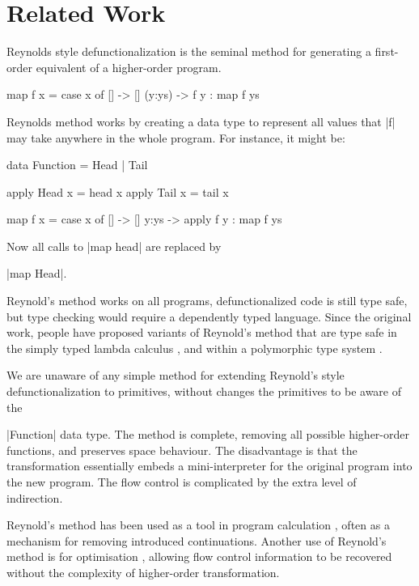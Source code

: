 \documentclass[preprint]{sigplanconf}
\begin{document}
\section{Related Work}
\label{sec:related}

Reynolds style defunctionalization \cite{reynolds:defunc} is the seminal method for generating a first-order equivalent of a higher-order program.

\begin{example}
\begin{code}
map f x = case  x of
                []      -> []
                (y:ys)  -> f y : map f ys
\end{code}

\noindent Reynolds method works by creating a data type to represent all values that |f| may take anywhere in the whole program. For instance, it might be:

\ignore\begin{code}
data Function = Head | Tail

apply Head  x = head  x
apply Tail  x = tail  x

map f x = case  x of
                []    -> []
                y:ys  -> apply f y : map f ys
\end{code}

\noindent Now all calls to |map head| are replaced by \ignore|map Head|.
\end{example}

Reynold's method works on all programs, defunctionalized code is still type safe, but type checking would require a dependently typed language. Since the original work, people have proposed variants of Reynold's method that are type safe in the simply typed lambda calculus \cite{bell:type_driven_defunctionalization}, and within a polymorphic type system \cite{pottier:polymorhpic_typed_defunctionaization}.

We are unaware of any simple method for extending Reynold's style defunctionalization to primitives, without changes the primitives to be aware of the \ignore|Function| data type. The method is complete, removing all possible higher-order functions, and preserves space behaviour. The disadvantage is that the transformation essentially embeds a mini-interpreter for the original program into the new program. The flow control is complicated by the extra level of indirection.

Reynold's method has been used as a tool in program calculation \cite{danvy:defunctionalization_at_work,hutton:calculating_an_exceptional_machine}, often as a mechanism for removing introduced continuations. Another use of Reynold's method is for optimisation \cite{grin,jhc}, allowing flow control information to be recovered without the complexity of higher-order transformation.
\end{document}
